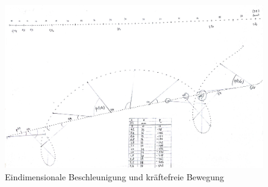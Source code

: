 \documentclass[12pt,a4paper]{article}
\begin{document}
\begin{figure}[H]
	\centering
	\includegraphics[scale=0.25, angle=-90]{./figure/bewegungen.jpg}
	\caption{Eindimensionale Beschleunigung und kräftefreie Bewegung}
	\label{fig:bewegungen}
\end{figure}
\end{document}
